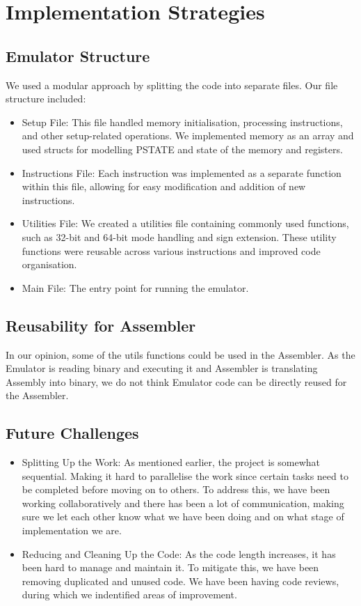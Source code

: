 \documentclass[11pt]{article}
\begin{document}
\section{Implementation Strategies}

\subsection*{Emulator Structure}

We used a modular approach by splitting the code into separate files. Our file structure included:
\begin{itemize}
    \item Setup File: This file handled memory initialisation, processing instructions, and other setup-related operations. 
        We implemented memory as an array and used structs for modelling PSTATE and state of the memory and registers.
    \item Instructions File: Each instruction was implemented as a separate function within this file, allowing for easy 
        modification and addition of new instructions.
    \item Utilities File: We created a utilities file containing commonly used functions, such as 32-bit and 64-bit mode handling 
        and sign extension. These utility functions were reusable across various instructions and improved code organisation.
    \item Main File: The entry point for running the emulator.
\end{itemize}

\subsection*{Reusability for Assembler}
In our opinion, some of the utils functions could be used in the Assembler. As the Emulator is reading binary and executing it 
and Assembler is translating Assembly into binary, we do not think Emulator code can be directly reused for the Assembler.

\subsection*{Future Challenges}
\begin{itemize}
    \item Splitting Up the Work: As mentioned earlier, the project is somewhat sequential. 
    Making it hard to parallelise the work since certain tasks need to be completed before moving on to others. 
    To address this, we have been working collaboratively and there has been a lot of communication, making sure we let each other know
    what we have been doing and on what stage of implementation we are.
    \item Reducing and Cleaning Up the Code: As the code length increases, it has been hard to manage and maintain it. To mitigate this,
    we have been removing duplicated and unused code. We have been having code reviews, during which we indentified areas of improvement.
\end{itemize}
\end{document}
